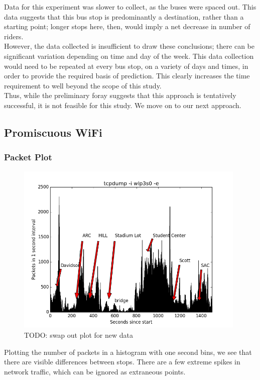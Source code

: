 \documentclass[letterpaper,abstract=on,titlepage=false]{scrreprt}
\begin{document}
	Data for this experiment was slower to collect, as the buses were spaced out.
	This data suggests that this bus stop is predominantly a destination, rather than a starting point; longer stops here, then, would imply a net decrease in number of riders.
	\\
	However, the data collected is insufficient to draw these conclusions; there can be significant variation depending on time and day of the week.
	This data collection would need to be repeated at every bus stop, on a variety of days and times, in order to provide the required basis of prediction.
	This clearly increases the time requirement to well beyond the scope of this study.
	\\
	Thus, while the preliminary foray suggests that this approach is tentatively successful, it is not feasible for this study.
	We move on to our next approach.

\subsection*{Promiscuous WiFi}
    
	\subsubsection*{Packet Plot}

		\begin{figure}[H]
		\includegraphics[width=11cm]{packets}
		\\TODO: swap out plot for new data
		\centering
		\end{figure}

		Plotting the number of packets in a histogram with one second bins, we see that there are visible differences between stops. %
		There are a few extreme spikes in network traffic, which can be ignored as extraneous points.
\end{document}
